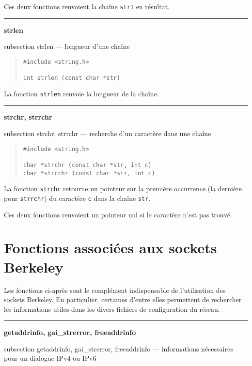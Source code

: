 \documentclass [twoside] {report}
\newcommand {\primitive} [1]
    {
	{\large \bf #1}
	\addcontentsline {toc} {subsection} {#1}
    }
\newcommand {\separation}
    {
	\vspace {7mm}
	\nopagebreak
	\hrule
    }
\begin{document}
Ces deux fonctions renvoient la chaîne {\tt str1} en
résultat.


\separation 
\primitive {strlen} --- longueur d'une chaîne

\begin {quote}
\begin {verbatim}
#include <string.h>

int strlen (const char *str)
\end{verbatim}
\end {quote}

La fonction {\tt strlen} renvoie la longueur de la chaîne.


\separation 
\primitive {strchr, strrchr} --- recherche d'un caractère dans une chaîne

\begin {quote}
\begin {verbatim}
#include <string.h>

char *strchr (const char *str, int c)
char *strrchr (const char *str, int c)
\end{verbatim}
\end {quote}

La fonction {\tt strchr} retourne un pointeur sur la première
occurrence (la dernière pour {\tt strrchr}) du caractère {\tt c}
dans la chaîne {\tt str}.

Ces deux fonctions renvoient un pointeur nul si le
caractère n'est pas trouvé.



\section {Fonctions associées aux sockets Berkeley}

Les fonctions ci-après sont le complément indispensable de l'utilisation
des sockets Berkeley.  En particulier, certaines d'entre elles
permettent de rechercher les informations utiles dans les divers
fichiers de configuration du réseau.


\separation
\primitive {getaddrinfo, gai\_strerror, freeaddrinfo} --- informations
    nécessaires pour un dialogue IPv4 ou IPv6
\end{document}
